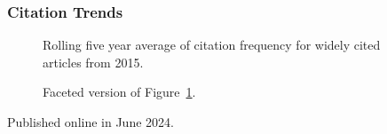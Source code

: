 \documentclass[
  10pt,
  letterpaper,
  DIV=11,
  numbers=noendperiod,
  twoside]{scrartcl}
\begin{document}
\subsubsection*{Citation Trends}\label{citation-trends-39}

\begin{figure}


\caption{\label{fig-citation-spaghetti-2015}Rolling five year average of
citation frequency for widely cited articles from 2015.}

\end{figure}%

\begin{figure}


\caption{\label{fig-citation-facet-2015}Faceted version of
Figure~\ref{fig-citation-spaghetti-2015}.}

\end{figure}%

\newpage



\noindent Published online in June 2024.
\end{document}
